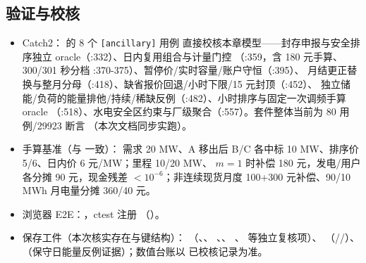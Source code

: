 \subsection{验证与校核}
\begin{itemize}
  \item Catch2： 的 8 个 \texttt{[ancillary]} 用例
        直接校核本章模型——封存申报与安全排序独立 oracle（:332）、日内复用组合与计量门控
        （:359，含 180 元手算、300/301 秒分档 :370-375）、暂停价/实时容量/账户守恒（:395）、
        月结更正替换与整月分母（:418）、缺省报价回退/小时下限/15 元封顶（:452）、
        独立储能/负荷的能量排他/持续/稀缺反例（:482）、小时排序与固定一次调频手算 oracle
        （:518）、水电安全区约束与厂级聚合（:557）。套件整体当前为 80 用例/29923 断言
        （本次文档同步实跑）。
  \item 手算基准（与  一致）：
        需求 20 MW、A 移出后 B/C 各中标 10 MW、排序价 5/6、日内价 6 元/MW；里程 10/20 MW、
        $m=1$ 时补偿 180 元，发电/用户各分摊 90 元，现金残差 $<10^{-6}$；非连续现货月度
        100+300 元补偿、90/10 MWh 月电量分摊 360/40 元。
  \item 浏览器 E2E：，ctest 注册
        （）。
  \item 保存工件（本次核实存在与键结构）：
        （、、
        、、
        、 等独立复核项）、\allowbreak
        （/\allowbreak{}/\allowbreak{}）、\allowbreak
        （保守日能量反例证据）；数值台账以
         已校核记录为准。
\end{itemize}

